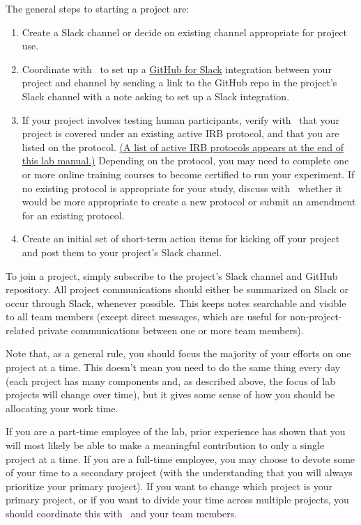 \documentclass{tufte-book} %
\begin{document}
The general steps to starting a project are:
\begin{enumerate}

\item Create a Slack channel or decide on existing channel appropriate
  for project use.  
\item Coordinate with \director~to set up a
  \href{https://get.slack.help/hc/en-us/articles/232289568-GitHub-for-Slack}{GitHub
    for Slack} integration between your project and channel by sending
  a link to the GitHub repo in the project's Slack channel with a note
  asking to set up a Slack integration.
\item If your project involves testing human participants, verify with
  \director~that your project is covered under an existing active IRB
  protocol, and that you are listed on the protocol.
  \hyperref[ch:irb]{(A list of active IRB protocols appears at the end
    of this lab manual.)}  Depending on the protocol, you may need to
  complete one or more online training courses to become certified to
  run your experiment.  If no existing protocol is appropriate for
  your study, discuss with \director~whether it would be more
  appropriate to create a new protocol or submit an amendment for an
  existing protocol.
\item Create an initial set of short-term action items for kicking off
  your project and post them to your project's Slack channel.
\end{enumerate}


{}

\noindent To join a project, simply subscribe to the project's Slack
channel and GitHub repository.  All project communications should
either be summarized on Slack or occur through Slack, whenever
possible.  This keeps notes searchable and visible to all team members
(except direct messages, which are useful for non-project-related
private communications between one or more team members).

Note that, as a general rule, you should focus the majority of your
efforts on one project at a time.  This doesn't mean you need to do
the same thing every day (each project has many components and, as
described above, the focus of lab projects will change over time), but
it gives some sense of how you should be allocating your work time.

If you are a part-time employee of the lab, prior experience has shown
that you will most likely be able to make a meaningful contribution to
only a single project at a time.  If you are a full-time employee, you
may choose to devote some of your time to a secondary project (with
the understanding that you will always prioritize your primary
project).  If you want to change which project is your primary
project, or if you want to divide your time across multiple projects,
you should coordinate this with \director~and your team members.
\end{document}
